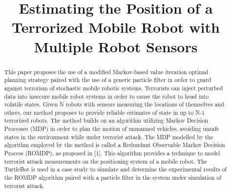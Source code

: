 \documentclass[conference]{IEEEtran}
\begin{document}
\title{Estimating the Position of a Terrorized Mobile Robot with Multiple Robot Sensors}


\author{
}

\maketitle

\begin{abstract}
This paper proposes the use of a modified Markov-based value iteration optimal planning strategy paired with the use of a generic particle filter in order to guard against terrorism of stochastic mobile robotic systems. Terrorists can inject perturbed data into insecure mobile robot systems in order to cause the robot to head into volatile states. Given N robots with sensors measuring
the locations of themselves and others, our method proposes to provide
reliable estimates of state in up to N-1 terrorized robots. The method builds on an algorithm
utilizing Markov Decision Processes (MDP) in order to plan the motion of unmanned vehicles, avoiding unsafe states in the environment while under terrorist attack. The MDP modelled by the algorithm employed by the method is called a Redundant Observable Markov Decision Process (ROMDP), as proposed in [1]. This algorithm provides a technique to model terrorist attack measurements on the positioning system of a mobile robot. The TurtleBot is used in a case study to simulate and determine the experimental results of the ROMDP algorithm paired with a particle filter in the system under simulation of terrorist attack.
\end{abstract}
\end{document}
